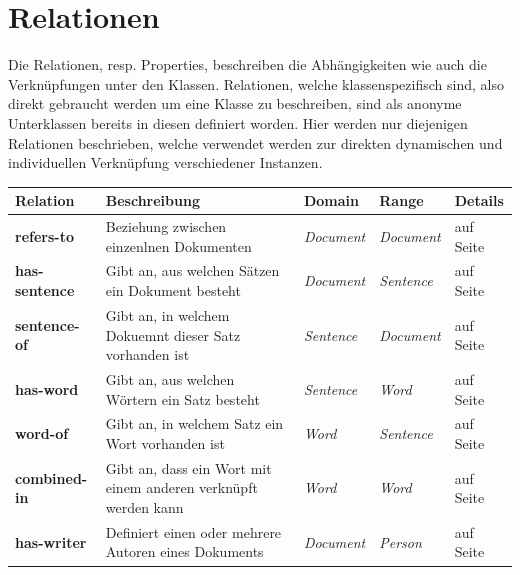 \documentclass[draft,
    11pt,
    latin1,
    a4paper,
    oneside
]{scrreprt}
\let\oldemph=\emph
\renewcommand{\emph}[1]{\index{#1}\oldemph{#1}}
\begin{document}

\section{Relationen} \label{sec:reltations}

Die Relationen, resp. Properties, beschreiben die Abh\"angigkeiten wie auch die Verkn\"upfungen unter den Klassen. Relationen, welche klassenspezifisch sind, also direkt gebraucht werden um eine Klasse zu beschreiben, sind als anonyme Unterklassen bereits in diesen definiert worden. Hier werden nur diejenigen Relationen beschrieben, welche verwendet werden zur direkten dynamischen und individuellen Verkn\"upfung verschiedener Instanzen.

\begin{table}[H]
  \centering
  \begin{tabular}{ | l | p{4cm} | p{3cm} | p{2cm} | p{2cm} | }
    \hline
    \textbf{Relation} & \textbf{Beschreibung} & \textbf{Domain} & \textbf{Range} & \textbf{Details} \\ \hline
    \textbf{refers-to} & Beziehung zwischen einzenlnen Dokumenten & \emph{Document} & \emph{Document} & \nameref{sec:rel_refersto} auf Seite \pageref{sec:rel_refersto} \\ \hline
    \textbf{has-sentence} & Gibt an, aus welchen S\"atzen ein Dokument besteht & \emph{Document} & \emph{Sentence} & \nameref{sec:rel_hassentence} auf Seite \pageref{sec:rel_hassentence} \\ \hline
    \textbf{sentence-of} & Gibt an, in welchem Dokuemnt dieser Satz vorhanden ist & \emph{Sentence} & \emph{Document} & \nameref{sec:rel_sentenceof} auf Seite \pageref{sec:rel_sentenceof} \\ \hline
    \textbf{has-word} & Gibt an, aus welchen W\"ortern ein Satz besteht & \emph{Sentence} & \emph{Word} & \nameref{sec:rel_hasword} auf Seite \pageref{sec:rel_hasword} \\ \hline
    \textbf{word-of} & Gibt an, in welchem Satz ein Wort vorhanden ist & \emph{Word} & \emph{Sentence} & \nameref{sec:rel_wordof} auf Seite \pageref{sec:rel_wordof} \\ \hline
    \textbf{combined-in} & Gibt an, dass ein Wort mit einem anderen verkn\"upft werden kann & \emph{Word} & \emph{Word} & \nameref{sec:rel_wordcombo} auf Seite \pageref{sec:rel_wordcombo} \\ \hline
    \textbf{has-writer} & Definiert einen oder mehrere Autoren eines Dokuments & \emph{Document} & \emph{Person} & \nameref{sec:rel_haswriter} auf Seite \pageref{sec:rel_haswriter} \\ \hline

\end{tabular}
\end{table}
\end{document}
